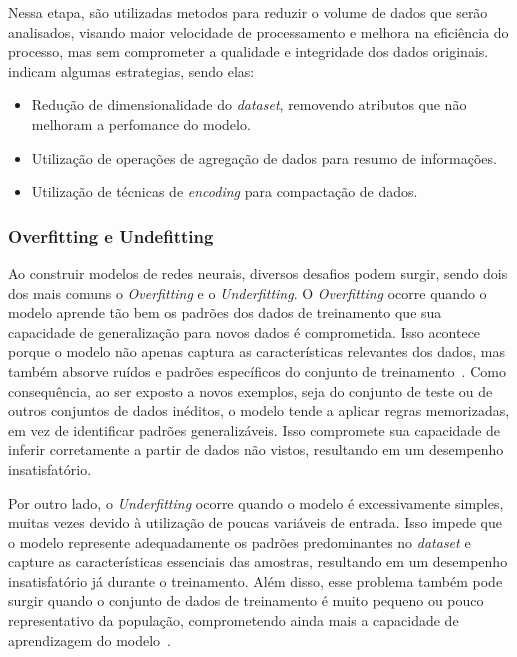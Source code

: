                 Nessa etapa, são utilizadas metodos para reduzir o volume de dados que serão analisados, visando maior velocidade
                de processamento e melhora na eficiência do processo, mas sem comprometer a qualidade e integridade dos dados 
                originais.~ indicam algumas estrategias, sendo elas:
                \begin{itemize}
                    \item Redução de dimensionalidade do \emph{dataset}, removendo atributos que não melhoram a perfomance do 
                    modelo.
                    \item Utilização de operações de agregação de dados para resumo de informações.
                    \item Utilização de técnicas de \emph{encoding} para compactação de dados.
                \end{itemize}

        \subsubsection{Overfitting e Undefitting}
            Ao construir modelos de redes neurais, diversos desafios podem surgir, sendo dois dos mais comuns o 
            \emph{Overfitting} e o \emph{Underfitting}. O \emph{Overfitting} ocorre quando o modelo aprende tão 
            bem os padrões dos dados de treinamento que sua capacidade de generalização para novos dados é 
            comprometida. Isso acontece porque o modelo não apenas captura as características relevantes dos dados, 
            mas também absorve ruídos e padrões específicos do conjunto de treinamento~\cite{montesinos2022}. 
            Como consequência, ao ser exposto a novos exemplos, seja do conjunto de teste ou de outros conjuntos de 
            dados inéditos, o modelo tende a aplicar regras memorizadas, em vez de identificar padrões generalizáveis. 
            Isso compromete sua capacidade de inferir corretamente a partir de dados não vistos, resultando em um 
            desempenho insatisfatório.

            Por outro lado, o \emph{Underfitting} ocorre quando o modelo é excessivamente simples, muitas vezes 
            devido à utilização de poucas variáveis de entrada. Isso impede que o modelo represente adequadamente 
            os padrões predominantes no \emph{dataset} e capture as características essenciais das amostras, 
            resultando em um desempenho insatisfatório já durante o treinamento. Além disso, esse problema também 
            pode surgir quando o conjunto de dados de treinamento é muito pequeno ou pouco representativo da 
            população, comprometendo ainda mais a capacidade de aprendizagem do modelo~\cite{montesinos2022}.
            
